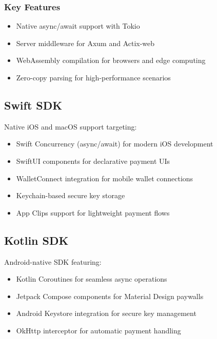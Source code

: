 \subsubsection{Key Features}

\begin{itemize}
    \item Native async/await support with Tokio
    \item Server middleware for Axum and Actix-web
    \item WebAssembly compilation for browsers and edge computing
    \item Zero-copy parsing for high-performance scenarios
\end{itemize}

\subsection{Swift SDK}
\label{subsec:swift-sdk}

Native iOS and macOS support targeting:
\begin{itemize}
    \item Swift Concurrency (async/await) for modern iOS development
    \item SwiftUI components for declarative payment UIs
    \item WalletConnect integration for mobile wallet connections
    \item Keychain-based secure key storage
    \item App Clips support for lightweight payment flows
\end{itemize}

\subsection{Kotlin SDK}
\label{subsec:kotlin-sdk}

Android-native SDK featuring:
\begin{itemize}
    \item Kotlin Coroutines for seamless async operations
    \item Jetpack Compose components for Material Design paywalls
    \item Android Keystore integration for secure key management
    \item OkHttp interceptor for automatic payment handling
\end{itemize}

